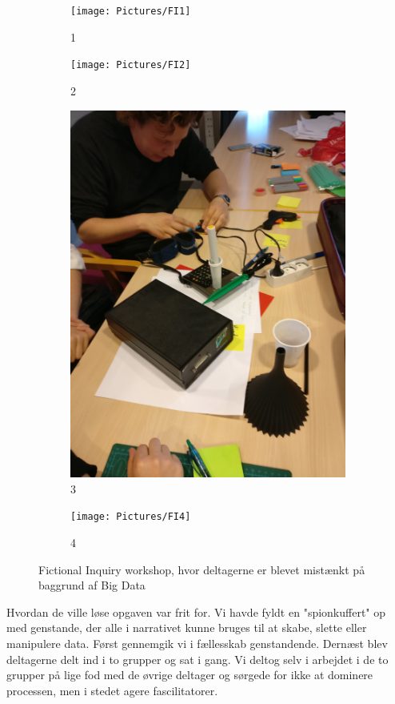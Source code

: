 \begin{figure}

\begin{subfigure}{.5\textwidth}
  \centering
  \texttt{[image: Pictures/FI1]}
    \caption{1}
  \label{fig:sfig1}
\end{subfigure}%
\begin{subfigure}{.5\textwidth}
  \centering
  \texttt{[image: Pictures/FI2]}
    \caption{2}
  \label{fig:sfig1}
\end{subfigure}
\begin{subfigure}{.5\textwidth}
  \centering
  \includegraphics[width=.8\linewidth]{Pictures/FI3}
    \caption{3}
  \label{fig:sfig2}
\end{subfigure}
\begin{subfigure}{.5\textwidth}
  \centering
  \texttt{[image: Pictures/FI4]}
  \caption{4}
  \label{fig:sfig1}
\end{subfigure}%
\caption{Fictional Inquiry workshop, hvor deltagerne er blevet mistænkt på baggrund af Big Data}
\label{fig:fictional}
\end{figure}

Hvordan de ville løse opgaven var frit for. Vi havde fyldt en "spionkuffert" op med genstande, der alle i narrativet kunne bruges til at skabe, slette eller manipulere data. Først gennemgik vi i fællesskab genstandende. Dernæst blev deltagerne delt ind i to grupper og sat i gang. Vi deltog selv i arbejdet i de to grupper på lige fod med de øvrige deltager og sørgede for ikke at dominere processen, men i stedet agere fascilitatorer.

